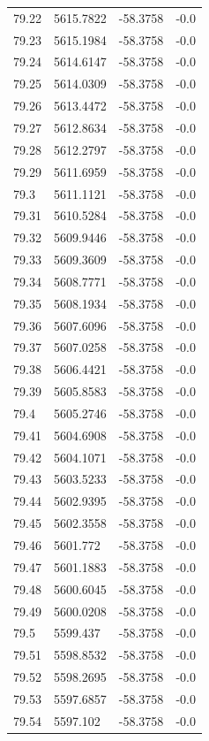 \begin{table}[H]
\begin{tabular}{llll}
79.22 & 5615.7822 & -58.3758 & -0.0 \\
79.23 & 5615.1984 & -58.3758 & -0.0 \\
79.24 & 5614.6147 & -58.3758 & -0.0 \\
79.25 & 5614.0309 & -58.3758 & -0.0 \\
79.26 & 5613.4472 & -58.3758 & -0.0 \\
79.27 & 5612.8634 & -58.3758 & -0.0 \\
79.28 & 5612.2797 & -58.3758 & -0.0 \\
79.29 & 5611.6959 & -58.3758 & -0.0 \\
79.3 & 5611.1121 & -58.3758 & -0.0 \\
79.31 & 5610.5284 & -58.3758 & -0.0 \\
79.32 & 5609.9446 & -58.3758 & -0.0 \\
79.33 & 5609.3609 & -58.3758 & -0.0 \\
79.34 & 5608.7771 & -58.3758 & -0.0 \\
79.35 & 5608.1934 & -58.3758 & -0.0 \\
79.36 & 5607.6096 & -58.3758 & -0.0 \\
79.37 & 5607.0258 & -58.3758 & -0.0 \\
79.38 & 5606.4421 & -58.3758 & -0.0 \\
79.39 & 5605.8583 & -58.3758 & -0.0 \\
79.4 & 5605.2746 & -58.3758 & -0.0 \\
79.41 & 5604.6908 & -58.3758 & -0.0 \\
79.42 & 5604.1071 & -58.3758 & -0.0 \\
79.43 & 5603.5233 & -58.3758 & -0.0 \\
79.44 & 5602.9395 & -58.3758 & -0.0 \\
79.45 & 5602.3558 & -58.3758 & -0.0 \\
79.46 & 5601.772 & -58.3758 & -0.0 \\
79.47 & 5601.1883 & -58.3758 & -0.0 \\
79.48 & 5600.6045 & -58.3758 & -0.0 \\
79.49 & 5600.0208 & -58.3758 & -0.0 \\
79.5 & 5599.437 & -58.3758 & -0.0 \\
79.51 & 5598.8532 & -58.3758 & -0.0 \\
79.52 & 5598.2695 & -58.3758 & -0.0 \\
79.53 & 5597.6857 & -58.3758 & -0.0 \\
79.54 & 5597.102 & -58.3758 & -0.0 \\

\end{tabular}
\end{table}
